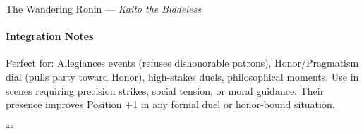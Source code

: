 \begin{followerbox}{The Wandering Ronin --- \emph{Kaito the Bladeless}}
\paragraph{Integration Notes}
Perfect for: Allegiances events (refuses dishonorable patrons), Honor/Pragmatism dial (pulls party toward Honor), high-stakes duels, philosophical moments. Use in scenes requiring precision strikes, social tension, or moral guidance. Their presence improves Position +1 in any formal duel or honor-bound situation.
\end{followerbox}
```
